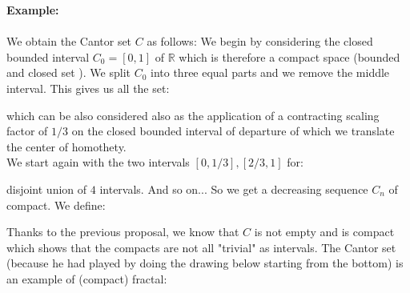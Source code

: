 	\begin{tcolorbox}[colframe=black,colback=white,sharp corners]
	\textbf{{\Large {}}Example:}\\\\
	We obtain the Cantor set $C$ as follows:
	We begin by considering the closed bounded interval $C_0=[0,1]$ of $\mathbb{R}$ which is therefore a compact space (bounded and closed set ). We split $C_0$ into three equal parts and we remove the middle interval. This gives us all the set:
	
	which can be also considered also as the application of a contracting scaling factor of $1/3$ on the closed bounded interval of departure of which we translate the center of homothety.\\
	
	We start again with the two intervals $[0,1/3],[2/3,1]$ for:
	
	disjoint union of $4$ intervals. And so on... So we get a decreasing sequence $C_n$ of compact. We define:
	
	Thanks to the previous proposal, we know that $C$ is not empty and is compact which shows that the compacts are not all "trivial" as intervals. The Cantor set (because he had played by doing the drawing below starting from the bottom) is an example of  (compact) fractal:
	\end{tcolorbox}
	
